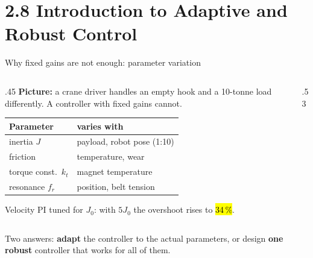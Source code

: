 \documentclass[aspectratio=169,10pt]{beamer}
\begin{document}
\section{2.8 Introduction to Adaptive and Robust Control}

\begin{frame}{Why fixed gains are not enough: parameter variation}
\begin{columns}[T]
\begin{column}{.45\textwidth}
\small
\textbf{Picture:} a crane driver handles an empty hook and a 10-tonne load differently. A controller with fixed gains cannot.
\vspace{1mm}

\begin{tabular}{@{}ll@{}}
\toprule
\textbf{Parameter} & \textbf{varies with}\\
\midrule
inertia $J$ & payload, robot pose (1:10)\\
friction & temperature, wear\\
torque const.\ $k_t$ & magnet temperature\\
resonance $f_r$ & position, belt tension\\
\bottomrule
\end{tabular}
\vspace{1mm}

Velocity PI tuned for $J_0$: with $5J_0$ the overshoot rises to \hl{34\,\%}.
\end{column}
\begin{column}{.53\textwidth}
\centering
{}
\end{column}
\end{columns}
\begin{notebox}
Two answers: \textbf{adapt} the controller to the actual parameters, or design \textbf{one robust} controller that works for all of them.
\end{notebox}
\end{frame}
\end{document}

